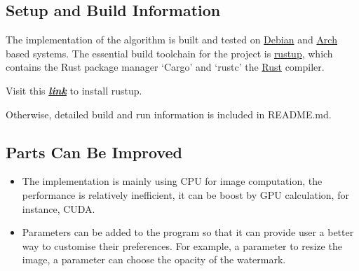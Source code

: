 \documentclass[12pt]{article}
\begin{document}
		
		
			
		
			
			
	
		\subsection{Setup and Build Information}
		
				The implementation of the algorithm is built and tested on \href{https://www.debian.org/}{Debian} and \href{https://archlinux.org/}{Arch} based systems. The essential build toolchain for the project is \href{https://rustup.rs/}{rustup}, which contains the Rust package manager `Cargo' and `rustc' the \href{https://www.rust-lang.org/}{Rust} compiler.
				
				Visit this \href{https://rustup.rs/}{\textit{\textbf{link}}} to install rustup.
				
				Otherwise, detailed build and run information is included in README.md.
				
		\subsection{Parts Can Be Improved}
			\begin{itemize}
				\item The implementation is mainly using CPU for image computation, the performance is relatively inefficient, it can be boost by GPU calculation, for instance, CUDA.
				
				\item Parameters can be added to the program so that it can provide user a better way to customise their preferences. For example, a parameter to resize the image, a parameter can choose the opacity of the watermark.
			\end{itemize}
		\pagebreak
\end{document}
